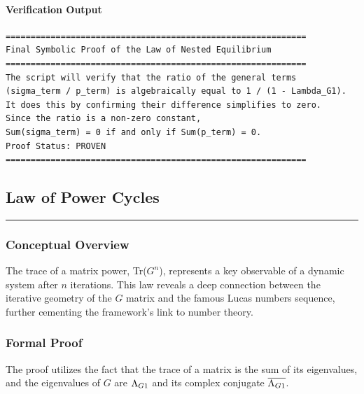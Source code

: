 \paragraph{Verification Output}
\begin{verbatim}
============================================================
Final Symbolic Proof of the Law of Nested Equilibrium
============================================================
The script will verify that the ratio of the general terms
(sigma_term / p_term) is algebraically equal to 1 / (1 - Lambda_G1).
It does this by confirming their difference simplifies to zero.
Since the ratio is a non-zero constant,
Sum(sigma_term) = 0 if and only if Sum(p_term) = 0.
Proof Status: PROVEN
============================================================
\end{verbatim}


\subsection*{Law of Power Cycles}
\hrule
\vspace{0.3cm}
\vspace{0.5cm}

\subsubsection*{Conceptual Overview}
The trace of a matrix power, Tr($G^n$), represents a key observable of a dynamic system after $n$ iterations. This law reveals a deep connection between the iterative geometry of the $G$ matrix and the famous Lucas numbers sequence, further cementing the framework's link to number theory.

\subsubsection*{Formal Proof}
The proof utilizes the fact that the trace of a matrix is the sum of its eigenvalues, and the eigenvalues of $G$ are $\Lambda_{G1}$ and its complex conjugate $\overline{\Lambda_{G1}}$.

